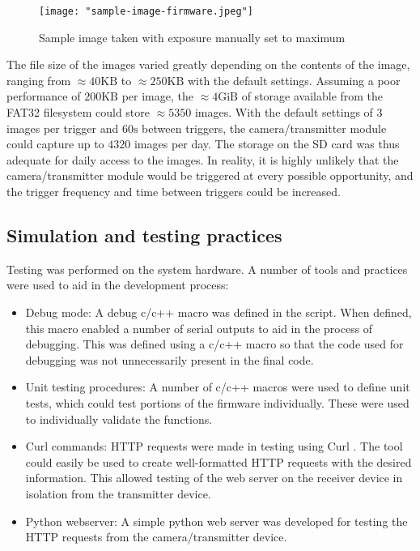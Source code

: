 \documentclass[class=report,11pt,crop=false]{standalone}
\begin{document}
\begin{figure}[ht]
    \centering
    \texttt{[image: "sample-image-firmware.jpeg"]}
    \caption{Sample image taken with exposure manually set to maximum}
    \label{fig:sample-image-firmware}
\end{figure}

The file size of the images varied greatly depending on the contents of the image, ranging from $\approx 40 \mathrm{KB}$ to $\approx 250 \mathrm{KB}$ with the default settings. Assuming a poor performance of $200 \mathrm{KB}$ per image, the $\approx 4 \mathrm{GiB}$ of storage available from the FAT32 filesystem could store $\approx 5350$ images. With the default settings of $3$ images per trigger and $60\mathrm{s}$ between triggers, the camera/transmitter module could capture up to $4320$ images per day. The storage on the SD card was thus adequate for daily access to the images. In reality, it is highly unlikely that the camera/transmitter module would be triggered at every possible opportunity, and the trigger frequency and time between triggers could be increased.

\subsection{Simulation and testing practices}

Testing was performed on the system hardware. A number of tools and practices were used to aid in the development process:

\begin{itemize}
    \item Debug mode: A debug c/c++ macro was defined in the script. When defined, this macro enabled a number of serial outputs to aid in the process of debugging. This was defined using a c/c++ macro so that the code used for debugging was not unnecessarily present in the final code.
    \item Unit testing procedures: A number of c/c++ macros were used to define unit tests, which could test portions of the firmware individually. These were used to individually validate the functions.
    \item Curl commands: HTTP requests were made in testing using Curl \cite{hostetter1997curl}. The tool could easily be used to create well-formatted HTTP requests with the desired information. This allowed testing of the web server on the receiver device in isolation from the transmitter device.
    \item Python webserver: A simple python web server was developed for testing the HTTP requests from the camera/transmitter device.
\end{itemize}
\end{document}

